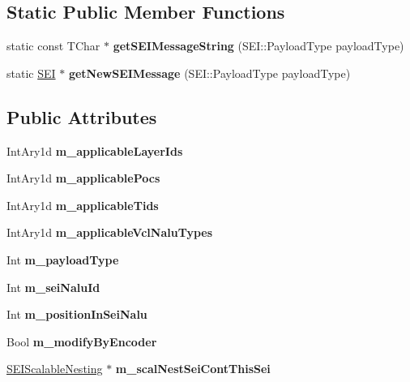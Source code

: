 \subsection*{Static Public Member Functions}
\begin{DoxyCompactItemize}
\item 
\mbox{\label{class_s_e_i_a25a3f6f1b193c5ef95b6f849d1bc9c39}} 
static const T\+Char $\ast$ {\bfseries get\+S\+E\+I\+Message\+String} (S\+E\+I\+::\+Payload\+Type payload\+Type)
\item 
\mbox{\label{class_s_e_i_a2722994379e1eeda4609438c61e3c040}} 
static \hyperlink{class_s_e_i}{S\+EI} $\ast$ {\bfseries get\+New\+S\+E\+I\+Message} (S\+E\+I\+::\+Payload\+Type payload\+Type)
\end{DoxyCompactItemize}
\subsection*{Public Attributes}
\begin{DoxyCompactItemize}
\item 
\mbox{\label{class_s_e_i_a1829dca9ed3c17f743f1f016307ed80e}} 
Int\+Ary1d {\bfseries m\+\_\+applicable\+Layer\+Ids}
\item 
\mbox{\label{class_s_e_i_ad346eb25d4f4f38ee9593aa7316cbaad}} 
Int\+Ary1d {\bfseries m\+\_\+applicable\+Pocs}
\item 
\mbox{\label{class_s_e_i_ae238692b6d5e731bcd90af02409ac7ff}} 
Int\+Ary1d {\bfseries m\+\_\+applicable\+Tids}
\item 
\mbox{\label{class_s_e_i_afcbf9fe98b943777b0a470772ee3f55c}} 
Int\+Ary1d {\bfseries m\+\_\+applicable\+Vcl\+Nalu\+Types}
\item 
\mbox{\label{class_s_e_i_a10fa529d02eeadc5cf1bbda00d5a9550}} 
Int {\bfseries m\+\_\+payload\+Type}
\item 
\mbox{\label{class_s_e_i_a29f0ecc236eaeeee1c6027c5be86ed4d}} 
Int {\bfseries m\+\_\+sei\+Nalu\+Id}
\item 
\mbox{\label{class_s_e_i_add28a238730dea6b5e7041e29af8c9d8}} 
Int {\bfseries m\+\_\+position\+In\+Sei\+Nalu}
\item 
\mbox{\label{class_s_e_i_a52c25ac0754eef6820749519af1f1ad6}} 
Bool {\bfseries m\+\_\+modify\+By\+Encoder}
\item 
\mbox{\label{class_s_e_i_aadd4d286f2339d32c0a553b85b25ffa3}} 
\hyperlink{class_s_e_i_scalable_nesting}{S\+E\+I\+Scalable\+Nesting} $\ast$ {\bfseries m\+\_\+scal\+Nest\+Sei\+Cont\+This\+Sei}
\end{DoxyCompactItemize}



